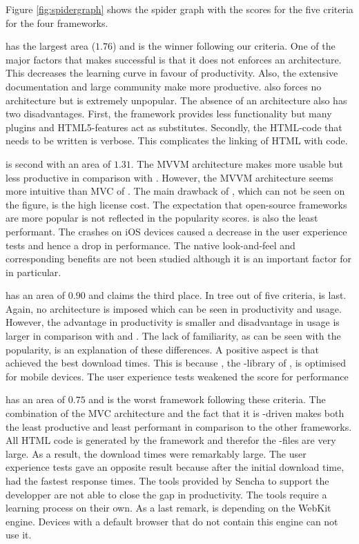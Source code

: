 \documentclass[a4paper]{artikel3}
\begin{document}
Figure \ref{fig:spidergraph} shows the spider graph with the scores for the five criteria for the four frameworks.

\jqma{} has the largest area ($1.76$) and is the winner following our criteria.
One of the major factors that makes \jqma{} successful is that it does not enforces an architecture.
This decreases the learning curve in favour of productivity.
Also,  the extensive documentation and large community make \jqma{} more productive.
\lungo{} also forces no architecture but is extremely unpopular.
The absence of 	an architecture also has two disadvantages.
First,  the framework provides less functionality but many plugins and HTML5-features act as substitutes.
Secondly,  the HTML-code that needs to be written is verbose.
This complicates the linking of HTML with \js{} code.

\kendoa{} is second with an area of $1.31$.
The MVVM architecture makes \kendoa{} more usable but less productive in comparison with \jqma{}.
However,  the MVVM architecture seems more intuitive than MVC of \sta{}.
The main drawback of \kendoa{},  which can not be seen on the figure, is the high license cost.
The expectation that open-source frameworks are more popular is not reflected in the popularity scores.
\kendoa{} is also the least performant.
The crashes on iOS devices caused a decrease in the user experience tests and hence a drop in performance.
The native look-and-feel and corresponding benefits are not been studied although it is an important factor for \kendoa{} in particular.

\lungo{} has an area of $0.90$ and claims the third place.
In tree out of five criteria,  \lungo{} is last.
Again, no architecture is imposed which can be seen in productivity and usage.
However,  the advantage in productivity is smaller and disadvantage in usage is larger in comparison with \sta{} and \kendoa{}.
The lack of familiarity,  as can be seen with the popularity,  is an explanation of these differences.
A positive aspect is that \lungo{} achieved the best download times.  
This is because \quo{},  the \js-library of \lungo{},  is optimised for mobile devices.
The user experience tests weakened the score for performance


\sta {} has an area of $0.75$ and is the worst framework following these criteria.
The combination of the MVC architecture and the fact that it is \js-driven makes \sta{} both the least productive and least performant in comparison to the other frameworks.
All HTML code is generated by the framework and therefor the \js-files are very large.
As a result,  the download times were remarkably large.
The user experience tests gave an opposite result because after the initial download time,  \sta{} had the fastest response times.
The tools provided by Sencha to support the developper are not able to close the gap in productivity.
The tools require a learning process on their own.
As a last remark,  \sta{} is depending on the WebKit engine.
Devices with a default browser that do not contain this engine can not use it.
\end{document}
